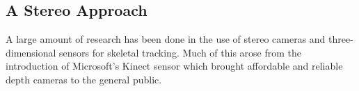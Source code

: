 \subsection{A Stereo Approach}

A large amount of research has been done in the use of stereo cameras and three-dimensional sensors for skeletal tracking. Much of this arose from the introduction of Microsoft's Kinect\cite{kinect} sensor which brought affordable and reliable depth cameras to the general public.





